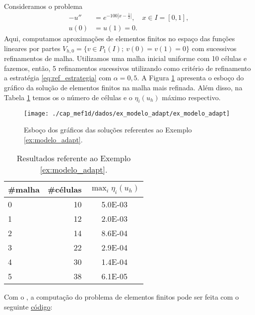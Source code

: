 \begin{ex}\label{ex:modelo_adapt}
  Consideramos o problema
  \begin{align}
    -u'' &= e^{-100|x-\frac{1}{2}|},\quad x\in I=[0,1],\\
    u(0) &= u(1) = 0.
  \end{align}
  Aqui, computamos aproximações de elementos finitos no espaço das funções lineares por partes $V_{h,0} = \{v\in P_1(I);~v(0)=v(1)=0\}$ com sucessivos refinamentos de malha. Utilizamos uma malha inicial uniforme com 10 células e fazemos, então, 5 refinamentos sucessivos utilizando como critério de refinamento a estratégia \eqref{eq:ref_estrategia} com $\alpha = 0,5$. A Figura \ref{fig:ex_modelo_adapt} apresenta o esboço do gráfico da solução de elementos finitos na malha mais refinada. Além disso, na Tabela \ref{tab:ex_modelo_adapt} temos os o número de células e o $\eta_i(u_h)$ máximo respectivo.

\begin{figure}[h!]
  \centering
  \texttt{[image: ./cap\_mef1d/dados/ex\_modelo\_adapt/ex\_modelo\_adapt]}
  \caption{Esboço dos gráficos das soluções referentes ao Exemplo \ref{ex:modelo_adapt}.}
  \label{fig:ex_modelo_adapt}
\end{figure}

\begin{table}[h!]
  \centering
  \begin{tabular}{lrc}
    \#malha & \#células & $\max_i\eta_i(u_h)$\\\hline
    0 & 10 & 5.0E-03\\
    1 & 12 & 2.0E-03\\
    2 & 14 & 8.6E-04\\
    3 & 22 & 2.9E-04\\
    4 & 30 & 1.4E-04\\
    5 & 38 & 6.1E-05\\\hline
  \end{tabular}
  \caption{Resultados referente ao Exemplo \ref{ex:modelo_adapt}.}
  \label{tab:ex_modelo_adapt}
\end{table}

\ifispython
Com o \fenics, a computação do problema de elementos finitos pode ser feita com o seguinte \href{https://github.com/phkonzen/notas/blob/master/src/MetodoElementosFinitos/cap_mef1d/dados/ex_modelo_adapt/ex_modelo_adapt.py}{código}:

\fi
\end{ex}

